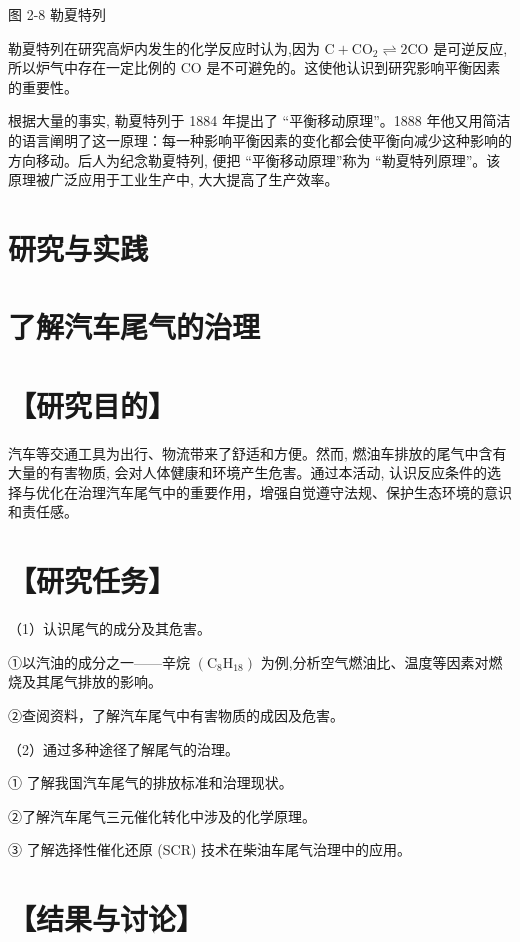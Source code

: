 \documentclass[10pt]{article}
\begin{document}
图 2-8 勒夏特列

勒夏特列在研究高炉内发生的化学反应时认为,因为 \(\mathrm{C} + {\mathrm{{CO}}}_{2} \rightleftharpoons 2\mathrm{{CO}}\) 是可逆反应,所以炉气中存在一定比例的 \(\mathrm{{CO}}\) 是不可避免的。这使他认识到研究影响平衡因素的重要性。

根据大量的事实, 勒夏特列于 1884 年提出了 “平衡移动原理”。1888 年他又用简洁的语言阐明了这一原理：每一种影响平衡因素的变化都会使平衡向减少这种影响的方向移动。后人为纪念勒夏特列, 便把 “平衡移动原理”称为 “勒夏特列原理”。该原理被广泛应用于工业生产中, 大大提高了生产效率。

\section*{研究与实践}

\section*{了解汽车尾气的治理}

\section*{【研究目的】}

汽车等交通工具为出行、物流带来了舒适和方便。然而, 燃油车排放的尾气中含有大量的有害物质, 会对人体健康和环境产生危害。通过本活动, 认识反应条件的选择与优化在治理汽车尾气中的重要作用，增强自觉遵守法规、保护生态环境的意识和责任感。

\section*{【研究任务】}

（1）认识尾气的成分及其危害。

①以汽油的成分之一——辛烷 \(\left( {{\mathrm{C}}_{8}{\mathrm{H}}_{18}}\right)\) 为例,分析空气燃油比、温度等因素对燃烧及其尾气排放的影响。

②查阅资料，了解汽车尾气中有害物质的成因及危害。

（2）通过多种途径了解尾气的治理。

① 了解我国汽车尾气的排放标准和治理现状。

②了解汽车尾气三元催化转化中涉及的化学原理。

③ 了解选择性催化还原 (SCR) 技术在柴油车尾气治理中的应用。

\section*{【结果与讨论】}
\end{document}

